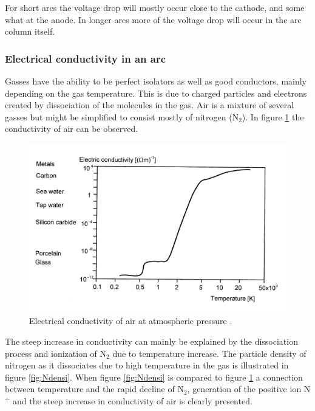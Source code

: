 \documentclass[10pt,a4paper]{article} %
\begin{document}
For short arcs the voltage drop will mostly occur close to the cathode, and some what at the anode. In longer arcs more of the voltage drop will occur in the arc column itself.

\subsubsection{Electrical conductivity in an arc} \label{sec:eleCondArc}
Gasses have the ability to be perfect isolators as well as good conductors, mainly depending on the gas temperature. This is due to charged particles and electrons created by dissociation of the molecules in the gas. Air is a mixture of several gasses but might be simplified to consist mostly of nitrogen (N$_2$). In figure \ref{fig:condAir} the conductivity of air can be observed.   

\begin{figure}[H]
\centering
\includegraphics[scale=0.8]{Bilder/Theory/airConduct.png}
\caption{Electrical conductivity of air at atmospheric pressure \cite{bib:HVEbreak}.} \label{fig:condAir}
\end{figure}

The steep increase in conductivity can mainly be explained by the dissociation process and ionization of N$_2$ due to temperature increase. The particle density of nitrogen as it dissociates due to high temperature in the gas is illustrated in figure \ref{fig:Ndensi}. When figure \ref{fig:Ndensi} is compared to figure \ref{fig:condAir} a connection between temperature and the rapid decline of N$_2$, generation of the positive ion N$^+$ and the steep increase in conductivity of air is clearly presented.
\end{document}
